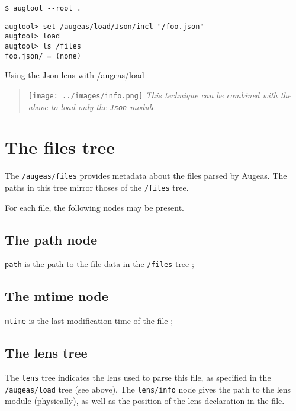    

\begin{listing}
  \begin{verbatim}
$ augtool --root .
  \end{verbatim}
  \begin{verbatim}
augtool> set /augeas/load/Json/incl "/foo.json"
augtool> load
augtool> ls /files
foo.json/ = (none)
  \end{verbatim}
  \caption{Using the Json lens with /augeas/load}
  \label{lst:metadata_json_lens}
\end{listing}

\begin{quote}
\texttt{[image: ../images/info.png]} \emph{This technique can be combined with the above to load only the \texttt{Json} module}

\end{quote}
\section{The files tree}


The \verb!/augeas/files! provides metadata about the files parsed by Augeas. The paths in this tree mirror thoses of the \verb!/files! tree.

For each file, the following nodes may be present.

\subsection{The path node}

\verb!path! is the path to the file data in the \verb!/files! tree ;

\subsection{The mtime node}

\verb!mtime! is the last modification time of the file ;

\subsection{The lens tree}

The \verb!lens! tree indicates the lens used to parse this file, as specified in the \verb!/augeas/load! tree (see above). The \verb!lens/info! node gives the path to the lens module (physically), as well as the position of the lens declaration in the file.

